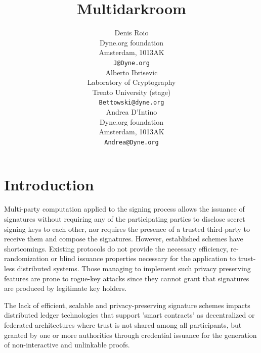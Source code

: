 \documentclass[twocolumn]{article}
\title{Multidarkroom}
\author{
    Denis Roio \\
	Dyne.org foundation \\
	Amsterdam, 1013AK \\
	\texttt{J@Dyne.org} \\
    \And
	Alberto Ibrisevic \\
	Laboratory of Cryptography\\
	Trento University (stage)\\
	\texttt{Bettowski@dyne.org} \\
    \And
    Andrea D'Intino \\
    Dyne.org foundation \\
    Amsterdam, 1013AK \\
    \texttt{Andrea@Dyne.org} \\
}
\begin{document}

\section{Introduction}

Multi-party computation applied to the signing process allows the
issuance of signatures without requiring any of the participating
parties to disclose secret signing keys to each other, nor requires the
presence of a trusted third-party to receive them and compose the
signatures. However, established schemes have shortcomings. Existing
protocols do not provide the necessary efficiency, re-randomization or
blind issuance properties necessary for the application to trust-less
distributed systems. Those managing to implement such privacy preserving
features are prone to rogue-key attacks \citep{ietf-bls} since they
cannot grant that signatures are produced by legitimate key holders.

The lack of efficient, scalable and privacy-preserving signature schemes
impacts distributed ledger technologies that support 'smart contracts'
as decentralized or federated architectures where trust is not shared
among all participants, but granted by one or more authorities through
credential issuance for the generation of non-interactive and unlinkable
proofs.
\end{document}
